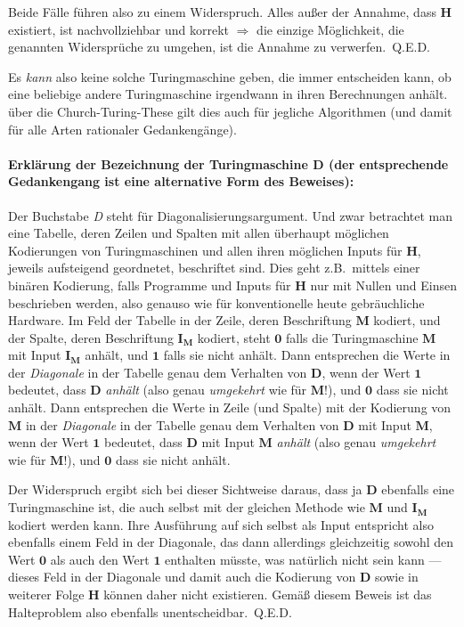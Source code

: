 \noindent Beide Fälle führen also zu einem Widerspruch. Alles außer der Annahme, dass $\mathbf{H}$ existiert, ist nachvollziehbar und korrekt $\Rightarrow$ die einzige Möglichkeit, die genannten Widersprüche zu umgehen, ist die Annahme zu verwerfen.~Q.E.D.\newline

\noindent Es \emph{kann} also keine solche Turingmaschine geben, die immer entscheiden kann, ob eine beliebige andere Turingmaschine irgendwann in ihren Berechnungen anhält. über die Church-Turing-These gilt dies auch für jegliche Algorithmen (und damit für alle Arten rationaler Gedankengänge).

\paragraph{Erklärung der Bezeichnung der Turingmaschine $\mathbf{D}$ (der entsprechende Gedankengang ist eine alternative Form des Beweises):} Der Buchstabe \emph{D} steht für Diagonalisierungsargument. Und zwar betrachtet man eine Tabelle, deren Zeilen und Spalten mit allen überhaupt möglichen Kodierungen von Turingmaschinen und allen ihren möglichen Inputs für $\mathbf{H}$, je\-weils aufsteigend geordnetet, beschriftet sind. Dies geht z.B.\ mittels einer binären Kodierung, falls Programme und Inputs für $\mathbf{H}$ nur mit Nullen und Einsen beschrieben werden, also genauso wie für konventionelle heute gebräuchliche Hardware. Im Feld der Tabelle in der Zeile, deren Beschriftung $\mathbf{M}$ kodiert, und der Spalte, deren Beschriftung $\mathbf{I_M}$ kodiert, steht $\mathbf{0}$ falls die Turingmaschine $\mathbf{M}$ mit Input $\mathbf{I_M}$ anhält, und $\mathbf{1}$ falls sie nicht anhält. Dann entsprechen die Werte in der \emph{Diagonale} in der Tabelle genau dem Verhalten von $\mathbf{D}$, wenn der Wert $\mathbf{1}$ bedeutet, dass $\mathbf{D}$ \emph{anhält} (also genau \emph{umgekehrt} wie für $\mathbf{M}$!), und $\mathbf{0}$ dass sie nicht anhält. Dann entsprechen die Werte in Zeile (und Spalte) mit der Kodierung von $\mathbf{M}$ in der \emph{Diagonale} in der Tabelle genau dem Verhalten von $\mathbf{D}$ mit Input $\mathbf{M}$, wenn der Wert $\mathbf{1}$ bedeutet, dass $\mathbf{D}$ mit Input $\mathbf{M}$ \emph{anhält} (also genau \emph{umgekehrt} wie für $\mathbf{M}$!), und $\mathbf{0}$ dass sie nicht anhält.

Der Widerspruch ergibt sich bei dieser Sichtweise daraus, dass ja $\mathbf{D}$ ebenfalls eine Tu\-ringmaschine ist, die auch selbst mit der gleichen Methode wie $\mathbf{M}$ und $\mathbf{I_M}$ kodiert werden kann. Ihre Ausführung auf sich selbst als Input entspricht also ebenfalls einem Feld in der Diagonale, das dann allerdings gleichzeitig sowohl den Wert $\mathbf{0}$ als auch den Wert $\mathbf{1}$ enthalten müsste, was natürlich nicht sein kann --- dieses Feld in der Diagonale und damit auch die Kodierung von $\mathbf{D}$ sowie in weiterer Folge $\mathbf{H}$ können daher nicht existieren. Gemäß diesem Beweis ist das Halteproblem also ebenfalls unentscheidbar.~Q.E.D.

